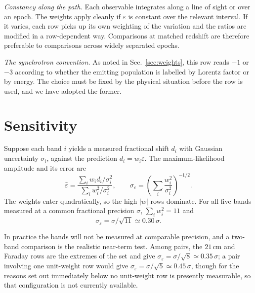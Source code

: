 \documentclass[aps,prd,twocolumn,superscriptaddress,nofootinbib,10pt]{revtex4-2}
\begin{document}
\emph{Constancy along the path.} Each observable integrates along a line of sight or over an epoch.
The weights apply cleanly if $\varepsilon$ is constant over the relevant interval. If it varies,
each row picks up its own weighting of the variation and the ratios are modified in a
row-dependent way. Comparisons at matched redshift are therefore preferable to comparisons across
widely separated epochs.

\emph{The synchrotron convention.} As noted in Sec.~\ref{sec:weights}, this row reads $-1$ or $-3$
according to whether the emitting population is labelled by Lorentz factor or by energy. The
choice must be fixed by the physical situation before the row is used, and we have adopted the
former.

\section{Sensitivity}\label{sec:sens}

Suppose each band $i$ yields a measured fractional shift $d_i$ with Gaussian uncertainty
$\sigma_i$, against the prediction $d_i = w_i \varepsilon$. The maximum-likelihood amplitude and
its error are
%
\begin{equation}
  \hat{\varepsilon} = \frac{\sum_i w_i d_i / \sigma_i^{2}}{\sum_i w_i^{2}/\sigma_i^{2}},
  \qquad
  \sigma_{\varepsilon} = \left( \sum_i \frac{w_i^{2}}{\sigma_i^{2}} \right)^{-1/2}.
  \label{eq:ml}
\end{equation}
%
The weights enter quadratically, so the high-$|w|$ rows dominate. For all five bands measured at a
common fractional precision $\sigma$, $\sum_i w_i^{2} = 11$ and
%
\begin{equation}
  \sigma_{\varepsilon} = \sigma / \sqrt{11} \simeq 0.30\,\sigma .
\end{equation}

In practice the bands will not be measured at comparable precision, and a two-band comparison is
the realistic near-term test. Among pairs, the $21\,$cm and Faraday rows are the extremes of the
set and give $\sigma_{\varepsilon} = \sigma/\sqrt{8} \simeq 0.35\,\sigma$; a pair involving one
unit-weight row would give $\sigma_{\varepsilon} = \sigma/\sqrt{5} \simeq 0.45\,\sigma$, though for
the reasons set out immediately below no unit-weight row is presently measurable, so that
configuration is not currently available.
\end{document}
